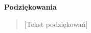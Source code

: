 \begin{alwayssingle}
  \thispagestyle{plain}
  \begin{center}
    \vspace*{1.5cm}
    {\large\bfseries Podziękowania}
  \end{center}
  \vspace{0.5cm}
  \begin{quote}
    [Tekst podziękowań]
  \end{quote}
\end{alwayssingle}
